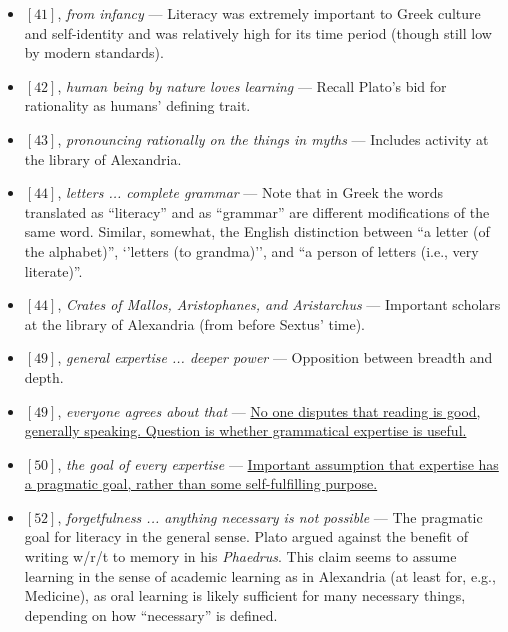 \documentclass[12pt]{article}
\begin{document}
\begin{itemize}

\item $[41]$, \textit{from infancy} --- Literacy was extremely important to Greek culture and self-identity and was relatively high for its time period (though still low by modern standards).

\item $[42]$, \textit{human being by nature loves learning} --- Recall Plato's bid for rationality as humans' defining trait.

\item $[43]$, \textit{pronouncing rationally on the things in myths} --- Includes activity at the library of Alexandria.

\item $[44]$, \textit{letters ... complete grammar} --- Note that in Greek the words translated as ``literacy'' and as ``grammar'' are different modifications of the same word. Similar, somewhat, the English distinction between ``a letter (of the alphabet)'', `'letters (to grandma)'', and ``a person of letters (i.e., very literate)''.

\item $[44]$, \textit{Crates of Mallos, Aristophanes, and Aristarchus} --- Important scholars at the library of Alexandria (from before Sextus' time).

\item $[49]$, \textit{general expertise ... deeper power} --- Opposition between breadth and depth.

\item $[49]$, \textit{everyone agrees about that} --- \ul{No one disputes that reading is good, generally speaking. Question is whether grammatical expertise is useful.}

\item $[50]$, \textit{the goal of every expertise} --- \ul{Important assumption that expertise has a pragmatic goal, rather than some self-fulfilling purpose.} 

\item $[52]$, \textit{forgetfulness ... anything necessary is not possible} --- The pragmatic goal for literacy in the general sense. Plato argued against the benefit of writing w/r/t to memory in his \textit{Phaedrus}. This claim seems to assume learning in the sense of academic learning as in Alexandria (at least for, e.g., Medicine), as oral learning is likely sufficient for many necessary things, depending on how ``necessary'' is defined.


\end{itemize}
\end{document}
